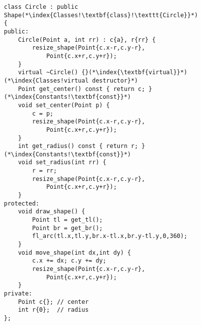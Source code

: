 \documentclass[10pt]{book}
\begin{document}
\begin{lstlisting}
class Circle : public Shape(*\index{Classes!\textbf{class}!\texttt{Circle}}*)
{
public:
    Circle(Point a, int rr) : c{a}, r{rr} {
        resize_shape(Point{c.x-r,c.y-r},
            Point{c.x+r,c.y+r});
    }
    virtual ~Circle() {}(*\index{\textbf{virtual}}*)(*\index{Classes!virtual destructor}*)
    Point get_center() const { return c; }(*\index{Constants!\textbf{const}}*)
    void set_center(Point p) {
        c = p;
        resize_shape(Point{c.x-r,c.y-r},
            Point{c.x+r,c.y+r});
    }
    int get_radius() const { return r; }(*\index{Constants!\textbf{const}}*)
    void set_radius(int rr) {
        r = rr;
        resize_shape(Point{c.x-r,c.y-r},
            Point{c.x+r,c.y+r});
    }
protected:
    void draw_shape() {
        Point tl = get_tl();
        Point br = get_br();
        fl_arc(tl.x,tl.y,br.x-tl.x,br.y-tl.y,0,360);
    }
    void move_shape(int dx,int dy) {
        c.x += dx; c.y += dy;
        resize_shape(Point{c.x-r,c.y-r},
            Point{c.x+r,c.y+r});
    }
private:
    Point c{}; // center
    int r{0};  // radius
};
\end{lstlisting}
%
%
\end{document}
